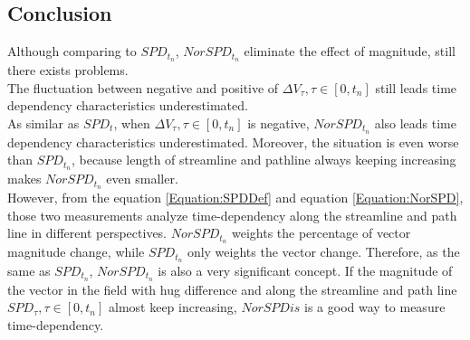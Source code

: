 \documentclass[
     11pt,         %
     a4paper,      %
     oneside,
     ]{article}
\begin{document}
	 \subsection{Conclusion}
	  Although comparing to $SPD_{t_{n}}$, $NorSPD_{t_{n}}$ eliminate the effect of magnitude, still there exists problems.\\
	  The fluctuation between negative and positive of $\Delta V_{\tau}, \tau\in[0,t_{n}]$ still leads time dependency characteristics underestimated. \\
	  As similar as $SPD_{t}$, when $\Delta V_{\tau}, \tau\in[0,t_{n}]$ is negative, $NorSPD_{t_{n}}$ also leads  time dependency characteristics underestimated. Moreover, the situation is even worse than $SPD_{t_{n}}$, because length of streamline and pathline always keeping increasing makes $NorSPD_{t_{n}}$ even smaller.\\
	  However, from the equation \ref{Equation:SPDDef} and equation \ref{Equation:NorSPD}, those two measurements analyze time-dependency along the streamline and path line in different perspectives. $NorSPD_{t_{n}}$ weights the percentage of vector magnitude change, while $SPD_{t_{n}}$ only weights the vector change. Therefore, as the same as $SPD_{t_{n}}$, $NorSPD_{t_{n}}$ is also a very significant concept. If the magnitude of the vector in the field with hug difference and along the streamline and path line $SPD_{\tau}, \tau \in [0,t_{n}]$ almost keep increasing, $NorSPDis$ is a good way to measure time-dependency.
	  \\



	  
\end{document}

